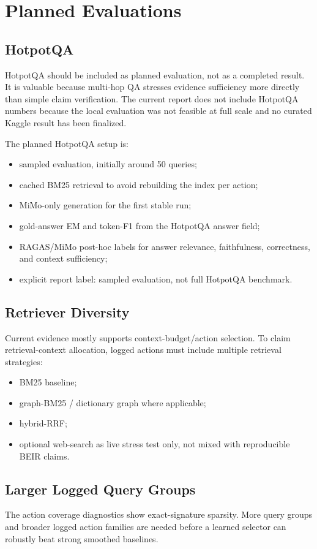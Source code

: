 \section{Planned Evaluations}

\subsection{HotpotQA}

HotpotQA should be included as planned evaluation, not as a completed result. It is valuable because multi-hop QA stresses evidence sufficiency more directly than simple claim verification. The current report does not include HotpotQA numbers because the local evaluation was not feasible at full scale and no curated Kaggle result has been finalized.

The planned HotpotQA setup is:

\begin{itemize}[leftmargin=*]
  \item sampled evaluation, initially around 50 queries;
  \item cached BM25 retrieval to avoid rebuilding the index per action;
  \item MiMo-only generation for the first stable run;
  \item gold-answer EM and token-F1 from the HotpotQA answer field;
  \item RAGAS/MiMo post-hoc labels for answer relevance, faithfulness, correctness, and context sufficiency;
  \item explicit report label: sampled evaluation, not full HotpotQA benchmark.
\end{itemize}

\subsection{Retriever Diversity}

Current evidence mostly supports context-budget/action selection. To claim retrieval-context allocation, logged actions must include multiple retrieval strategies:

\begin{itemize}[leftmargin=*]
  \item BM25 baseline;
  \item graph-BM25 / dictionary graph where applicable;
  \item hybrid-RRF;
  \item optional web-search as live stress test only, not mixed with reproducible BEIR claims.
\end{itemize}

\subsection{Larger Logged Query Groups}

The action coverage diagnostics show exact-signature sparsity. More query groups and broader logged action families are needed before a learned selector can robustly beat strong smoothed baselines.
